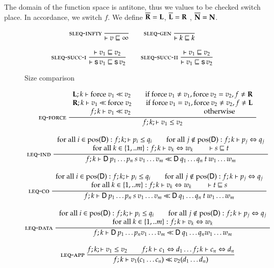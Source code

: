 The domain of the function space is antitone, thus we values to be checked switch place.
In accordance, we switch $f$.
We define $\overline{\mathbf{R}}=\mathbf{L}$,  $\overline{\mathbf{L}}=\mathbf{R}$ ,  $\overline{\mathbf{N}}=\mathbf{N}$.
\begin{figure}
\begin{gather*}
\mbox{\sc sleq-infty}\ \dfrac{}{\vdash v\sqsubseteq\infty}
\qquad
\mbox{\sc sleq-gen}\ \dfrac{}{\vdash k\sqsubseteq k}
\\[2ex]
\mbox{\sc sleq-succ-i}\ \dfrac{\vdash v_1\sqsubseteq v_2}{\vdash\mathsf{s}\, v_1\sqsubseteq\mathsf{s}\, v_2}
\qquad
\mbox{\sc sleq-succ-ii}\ \dfrac{\vdash v_1\sqsubseteq v_2}{\vdash v_1\sqsubseteq\mathsf{s}\, v_2}
\end{gather*}
\caption{Size comparison}
\end{figure}

\begin{figure}
\begin{gather*}
\nxru{\eqforce}
{\FleqVal{\lF}{k}{\forc \; v_1}{v_2} \qquad \mbox{if } \forc \: v_1 \neq v_1 , \forc \: v_2 = v_2  , f \neq \rF
}
{\FleqVal{\rF}{k}{v_1}{\forc \; v_2} \qquad \mbox{if } \forc \: v_1 = v_1 , \forc \: v_2 \neq v_2 , f \neq \lF }
{\FleqVal{f}{k}{v_1}{v_2} \qquad \qquad \qquad \qquad \qquad \mbox{ otherwise}}
{\LeqVal{f}{k}{v_1}{v_2}}
\\[2ex]
\ndru{\leqappind}
{\mbox{for all } i \in \pos(\DD): \LeqVal{f}{k}{p_i}{q_i} 
\qquad
\mbox{for all } j \notin \pos(\DD): \EqVal{f}{k}{p_j}{q_j} 
}
{\mbox{for all } k \in \{1,..m\}: \EqVal{f}{k}{v_k}{w_k}
\qquad
\SzLeq s t }
{\FleqVal{f}{k}{\DD \: p_1 \ldots p_n \: s \: v_1 \ldots v_m}{\DD \: q_1 \ldots q_n \: t \: w_1 \ldots w_m}}
\\[2ex]
\ndru{\leqappco}
{\mbox{for all } i \in \pos(\DD): \LeqVal{f}{k}{p_i}{q_i} 
\qquad
\mbox{for all } j \notin \pos(\DD): \EqVal{f}{k}{p_j}{q_j}}
{\mbox{for all } k \in \{1,..m\}:\EqVal{f}{k}{v_k}{w_k}
\qquad
\SzLeq t s }
{\FleqVal{f}{k}{\DD \: p_1 \ldots p_n \: s \: v_1 \ldots v_m}{\DD \: q_1 \ldots q_n \: t \: w_1 \ldots w_m}}
\\[2ex]
\ndru{\leqappd}
{\mbox{for all } i \in \pos(\DD): \LeqVal{f}{k}{p_i}{q_i} 
\qquad
\mbox{for all } j \notin \pos(\DD): \EqVal{f}{k}{p_j}{q_j}}
{\mbox{for all } k \in \{1,..m\}:\EqVal{f}{k}{v_k}{w_k}}
{\FleqVal{f}{k}{\DD \: p_1 \ldots p_n v_1 \ldots v_m}{\DD \: q_1 \ldots q_n w_1 \ldots w_m}}
\\[2ex]
\nru{\leqapp}
{\LeqVal{f}{k}{v_1}{v_2} \qquad
\EqVal{f}{k}{c_1}{d_1} \ldots \EqVal{f}{k}{c_n}{d_n}}
{\FleqVal{f}{k}{v_1 (c_1 \ldots c_n)}{v_2 (d_1 \ldots d_n)}}
\\[2ex]

\end{gather*}
\end{figure}
